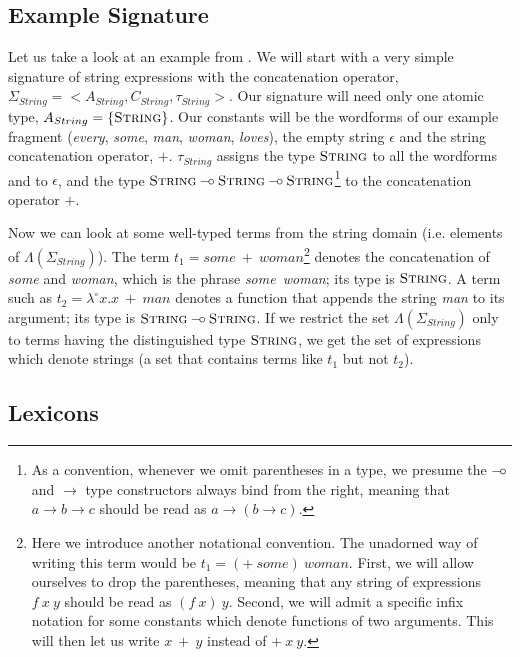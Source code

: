 \subsection{Example Signature}
\label{ssec:example-sig}

Let us take a look at an example from
\cite{pogodalla2007generalizing}. We will start with a very simple
signature of string expressions with the concatenation operator,
$\Sigma_{String} = \mathopen{<}A_{String}, C_{String},
\tau_{String}\mathclose{>}$. Our signature will need only one atomic
type, $A_{String} = \{\textsc{String}\}$. Our constants will be the
wordforms of our example fragment (\emph{every}, \emph{some},
\emph{man}, \emph{woman}, \emph{loves}), the empty string $\epsilon$ and
the string concatenation operator, $+$. $\tau_{String}$ assigns the type
$\textsc{String}$ to all the wordforms and to $\epsilon$, and the type
$\textsc{String} \mathbin{{-}\mkern-3.5mu{\circ}} \textsc{String} \mathbin{{-}\mkern-3.5mu{\circ}}
\textsc{String}$\footnote{As a convention, whenever we omit parentheses
  in a type, we presume the $\mathbin{{-}\mkern-3.5mu{\circ}}$ and $\to$ type constructors always
  bind from the right, meaning that $a \to b \to c$ should be read as $a
  \to (b \to c)$.}  to the concatenation operator $+$.

Now we can look at some well-typed terms from the string domain
(i.e. elements of $\Lambda(\Sigma_{String})$). The term $t_1 =
some\ +\ woman$\footnote{Here we introduce another notational
  convention. The unadorned way of writing this term would be $t_1 =
  (+\ some)\ woman$. First, we will allow ourselves to drop the
  parentheses, meaning that any string of expressions $f\ x\ y$ should
  be read as $(f\ x)\ y$. Second, we will admit a specific infix
  notation for some constants which denote functions of two
  arguments. This will then let us write $x\ +\ y$ instead of
  $+\ x\ y$.} denotes the concatenation of \emph{some} and \emph{woman},
which is the phrase \emph{some\ woman}; its type is $\textsc{String}$. A
term such as $t_2 = \lambda^{\circ} x. x\ +\ man$ denotes a function
that appends the string \emph{man} to its argument; its type is
$\textsc{String} \mathbin{{-}\mkern-3.5mu{\circ}} \textsc{String}$. If we restrict the set
$\Lambda(\Sigma_{String})$ only to terms having the distinguished type
$\textsc{String}$, we get the set of expressions which denote strings (a
set that contains terms like $t_1$ but not $t_2$).

\subsection{Lexicons}

